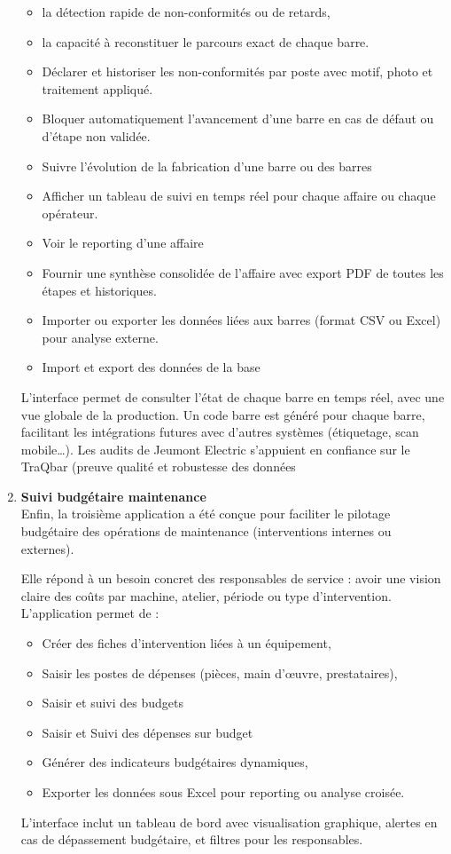 \documentclass[11pt,a4paper]{article}
\begin{document}
\begin{enumerate}
\begin{itemize}
    \item la détection rapide de non-conformités ou de retards,
    \item la capacité à reconstituer le parcours exact de chaque barre.
        \item Déclarer et historiser les non-conformités par poste avec motif, photo et traitement appliqué.
            \item Bloquer automatiquement l’avancement d’une barre en cas de défaut ou d'étape non validée.
    \item Suivre l'évolution de la fabrication d'une barre ou des barres
        \item Afficher un tableau de suivi en temps réel pour chaque affaire ou chaque opérateur.
    \item Voir le reporting d'une affaire
    \item Fournir une synthèse consolidée de l'affaire avec export PDF de toutes les étapes et historiques.
        \item Importer ou exporter les données liées aux barres (format CSV ou Excel) pour analyse externe.
    \item Import et export des données de la base
\end{itemize}

L’interface permet de consulter l’état de chaque barre en temps réel, avec une vue globale de la production. Un code barre est généré pour chaque barre, facilitant les intégrations futures avec d’autres systèmes (étiquetage, scan mobile…).  Les audits de Jeumont Electric s'appuient en confiance sur le TraQbar (preuve qualité et robustesse des données

    \item \textbf{Suivi budgétaire maintenance}
    \\
    Enfin, la troisième application a été conçue pour faciliter le pilotage budgétaire des opérations de maintenance (interventions internes ou externes).

Elle répond à un besoin concret des responsables de service : avoir une vision claire des coûts par machine, atelier, période ou type d’intervention. L’application permet de :
\begin{itemize}
    \item Créer des fiches d’intervention liées à un équipement,
    \item Saisir les postes de dépenses (pièces, main d’œuvre, prestataires),
    \item Saisir et suivi des budgets
    \item Saisir et Suivi des dépenses sur budget
    \item Générer des indicateurs budgétaires dynamiques,
    \item Exporter les données sous Excel pour reporting ou analyse croisée.
\end{itemize}

L’interface inclut un tableau de bord avec visualisation graphique, alertes en cas de dépassement budgétaire, et filtres pour les responsables.

\end{enumerate}
\end{document}
